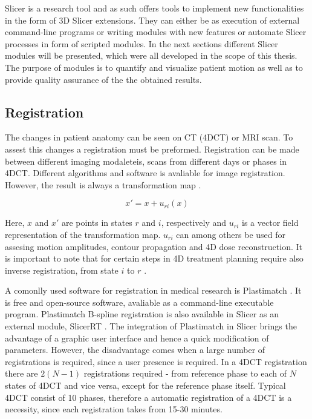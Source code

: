 \documentclass[type=dr, dr=rernat, accentcolor=tud7b,colorbacktitle, bigchapter, openright, twoside, 12pt ]{tudthesis}
\begin{document}
Slicer is a research tool and as such offers tools to implement new functionalities in the form of 3D Slicer extensions. They can either be as execution of external command-line programs or writing modules with new features or automate Slicer processes in form of scripted modules. 
In the next sections different Slicer modules will be presented, which were all developed in the scope of this thesis. The purpose of modules is to quantify and visualize patient motion as well as to provide quality assurance of the the obtained results.

\subsection{Registration}
\label{Registration}

The changes in patient anatomy can be seen on CT (4DCT) or MRI scan. To assest this changes a registration must be preformed. Registration can be made between different imaging modaleteis, scans from different days or phases in 4DCT. Different algorithms and software is avaliable
for image registration. However, the result is always a transformation map \cite{Richter2012}. 

\begin{equation}
\label{df}
x' = x + u_{ri}(x)
\end{equation} 

Here, $x$ and $x'$ are points in states $r$ and $i$, respectively and $u_{ri}$ is a vector field representation of the transformation map. $u_{ri}$ can among others be used for assesing motion amplitudes, contour propagation and 4D dose reconstruction. It is important to note
that for certain steps in 4D treatment planning require also inverse registration, from state $i$ to $r$ \cite{Richter2012}.

A comonlly used software for registration in medical research is Plastimatch \cite{Shackleford2010}. It is free and open-source software, avaliable as a command-line executable program. Plastimatch B-spline registration is also available in Slicer as an external module, SlicerRT \cite{Pinter2012}.  
The integration of Plastimatch in Slicer brings the advantage of a graphic user interface and hence a quick modification of parameters. However, the disadvantage comes when a large number of registrations is required, since a user presence is required. In a 4DCT registration
there are $2(N-1)$ registrations required - from reference phase to each of $N$ states of 4DCT and vice versa, except for the reference phase itself. Typical 4DCT consist of 10 phases, therefore a automatic registration of a 4DCT is a necessity, since each registration takes from 15-30 minutes.
\end{document}
